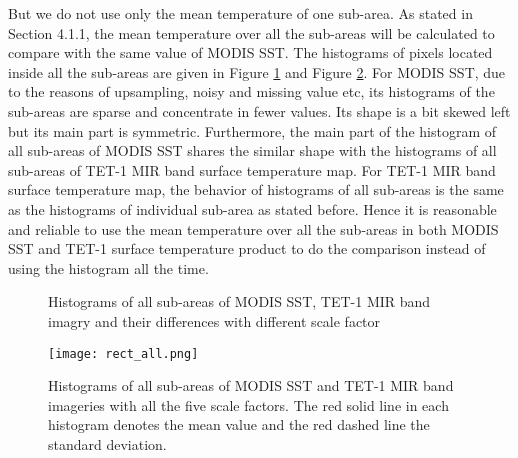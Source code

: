 \noindent But we do not use only the mean temperature of one sub-area. As stated in Section 4.1.1, the mean temperature over all the sub-areas will be calculated to compare with the same value of MODIS SST. The histograms of pixels located inside all the sub-areas are given in Figure \ref{fig:hist_all_rect} and Figure \ref{fig:rect_all_sc_all}. For MODIS SST, due to the reasons of upsampling, noisy and missing value etc, its histograms of the sub-areas are sparse and concentrate in fewer values. Its shape is a bit skewed left but its main part is symmetric. Furthermore, the main part of the histogram of all sub-areas of MODIS SST shares the similar shape with the histograms of all sub-areas of TET-1 MIR band surface temperature map. For TET-1 MIR band surface temperature map, the behavior of histograms of all sub-areas is the same as the histograms of individual sub-area as stated before. Hence it is reasonable and reliable to use the mean temperature over all the sub-areas in both MODIS SST and TET-1 surface temperature product to do the comparison instead of using the histogram all the time.\\

\begin{figure}[!htbp]
\centering
{}
\vspace{0.1in}
\caption{Histograms of all sub-areas of MODIS SST, TET-1 MIR band imagry and their differences with different scale factor}
\label{fig:hist_all_rect}
\end{figure}

\begin{figure}[!htbp]
\centering
\texttt{[image: rect\_all.png]}
\caption{Histograms of all sub-areas of MODIS SST and TET-1 MIR band imageries with all the five scale factors. The red solid line in each histogram denotes the mean value and the red dashed line the standard deviation.}
\label{fig:rect_all_sc_all}
\end{figure}

